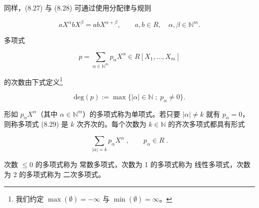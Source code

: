 同样，(8.27) 与 (8.28) 可通过使用分配律与规则

\[
a X^{\alpha}b X^{\beta}=a b X^{\alpha+\beta},\qquad a,b\in R,\quad\alpha,\beta\in\mathbb{N}^{m}.
\]

多项式

\begin{equation}
p=\sum_{\alpha\in\mathbb{N}^{m}}p_{\alpha}X^{\alpha}\in R[X_{1},\ldots,X_{m}]
\end{equation}

的次数由下式定义\footnote{我们约定 $\max(\emptyset) = -\infty$ 与 $\min(\emptyset) = \infty$。}

\[
\mathrm{d e g}(p):=\max\{|\alpha|\in\mathbb{N}\;;\;p_{\alpha}\neq0\}.
\]

形如  $ p_{\alpha}X^{\alpha} $（其中  $ \alpha \in \mathbb{N}^m $）的多项式称为单项式。若只要  $ |\alpha| \neq k $ 就有  $ p_{\alpha} = 0 $，则称多项式 (8.29) 是 $ k $ 次齐次的。每个次数为  $ k \in \mathbb{N} $ 的齐次多项式都具有形式

\[
\sum_{|\alpha|=k}p_{\alpha}X^{\alpha}\;,\qquad p_{\alpha}\in R\;.
\]

次数  $ \leq 0 $ 的多项式称为 $ \text{常数多项式} $，次数为 1 的多项式称为 $ \text{线性多项式} $，次数为 2 的多项式称为 $ \text{二次多项式} $。

